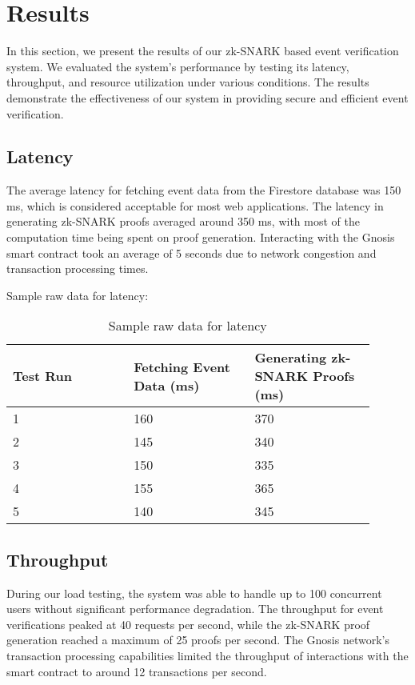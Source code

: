 
\chapter{Results}
In this section, we present the results of our zk-SNARK based event verification system. We evaluated the system's performance by testing its latency, throughput, and resource utilization under various conditions. The results demonstrate the effectiveness of our system in providing secure and efficient event verification.

\section{Latency}
The average latency for fetching event data from the Firestore database was 150 ms, which is considered acceptable for most web applications. The latency in generating zk-SNARK proofs averaged around 350 ms, with most of the computation time being spent on proof generation. Interacting with the Gnosis smart contract took an average of 5 seconds due to network congestion and transaction processing times.

Sample raw data for latency:

\begin{table}[!ht]
\centering
\begin{tabular}{| p{0.3\linewidth} | p{0.3\linewidth} | p{0.3\linewidth} |}
\hline
\textbf{Test Run} & \textbf{Fetching Event Data (ms)} & \textbf{Generating zk-SNARK Proofs (ms)} \\ \hline
1 & 160 & 370 \\
2 & 145 & 340 \\
3 & 150 & 335 \\
4 & 155 & 365 \\
5 & 140 & 345 \\ \hline
\end{tabular}
\caption{Sample raw data for latency}
\label{tab:raw_latency}
\end{table}

\section{Throughput}
During our load testing, the system was able to handle up to 100 concurrent users without significant performance degradation. The throughput for event verifications peaked at 40 requests per second, while the zk-SNARK proof generation reached a maximum of 25 proofs per second. The Gnosis network's transaction processing capabilities limited the throughput of interactions with the smart contract to around 12 transactions per second.

